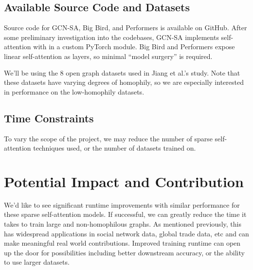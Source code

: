 \documentclass{article}
\begin{document}
\subsection{Available Source Code and Datasets}

Source code for GCN-SA,
Big Bird, and Performers
is available on GitHub.
After some preliminary investigation into the codebases,
GCN-SA implements self-attention with in a
custom PyTorch module.
Big Bird and Performers expose linear self-attention 
as layers, so minimal ``model surgery'' is required.

We'll be using the 8 open graph datasets
used in Jiang et al.'s study.
Note that these datasets have varying degrees
of homophily,
so we are especially interested
in performance on the low-homophily datasets.

\subsection{Time Constraints}

To vary the scope of the project,
we may reduce the number of sparse self-attention techniques
used, or the number of datasets trained on.

\section{Potential Impact and Contribution}

We'd like to see significant runtime improvements
with similar performance for these sparse
self-attention models. If successful, we can greatly
reduce the time it takes to train large and
non-homophilous graphs. As mentioned previously, 
this has widespread applications
in social network data, global trade data, etc and
can make meaningful real world contributions.
Improved training runtime can open up the door
for possibilities including 
better downstream accuracy,
or the ability to use larger datasets.

\end{document}
